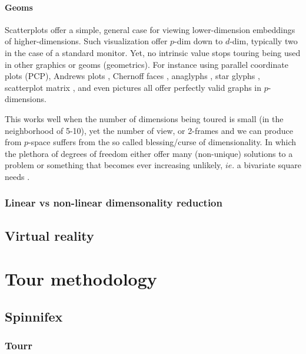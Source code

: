 \documentclass{monashthesis}
\begin{document}
\subsubsection{Geoms}\label{geoms}

Scatterplots offer a simple, general case for viewing lower-dimension
embeddings of higher-dimensions. Such visualization offer \(p\)-dim down
to \(d\)-dim, typically two in the case of a standard monitor. Yet, no
intrinsic value stops touring being used in other graphics or geoms
(geometrics). For instance using parallel coordinate plots
(PCP)\autocite{ocagne_coordonnees_1885}, Andrews plots
\autocite{andrews_plots_1972}, Chernoff faces
\autocite{chernoff_use_1973}, anaglyphs \autocite{rollmann_zwei_1853},
star glyphs \autocite{siegel_surgical_1972}, scatterplot matrix
\autocite{chambers_graphical_1983}, and even pictures all offer
perfectly valid graphs in \(p\)-dimensions.

This works well when the number of dimensions being toured is small (in
the neighborhood of 5-10), yet the number of view, or 2-frames and we
can produce from \(p\)-space suffers from the so called blessing/curse
of dimensionality. In which the plethora of degrees of freedom either
offer many (non-unique) solutions to a problem or something that becomes
ever increasing unlikely, \(ie.\) a bivariate square needs .

\subsection{Linear vs non-linear dimensonality
reduction}\label{linear-vs-non-linear-dimensonality-reduction}

\section{Virtual reality}\label{virtual-reality}

\chapter{Tour methodology}\label{ch:tour}

\section{Spinnifex}\label{spinnifex}

\subsection{Tourr}\label{tourr}
\end{document}
